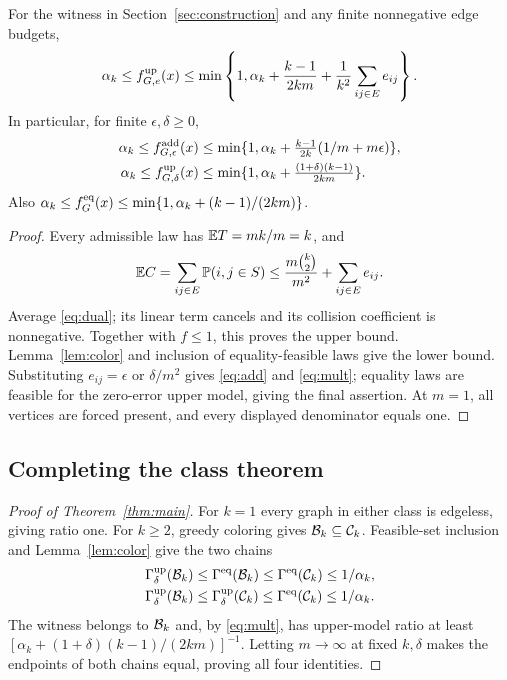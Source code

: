 \begin{theorem}\label{thm:finite}
For the witness in Section~\ref{sec:construction} and any finite
nonnegative edge budgets,
\begin{equation}\label{eq:hetero}
 \alpha_k\leq f_{G,e}^{\mathrm{up}}(x)\leq
 \min\left\{1,\alpha_k+\frac{k-1}{2km}+\frac1{k^2}\sum_{ij\in E}e_{ij}\right\}.
\end{equation}
In particular, for finite \(\epsilon,\delta\geq0\),
\begin{align}
 \alpha_k\leq f_{G,\epsilon}^{\mathrm{add}}(x)&\leq
 \min\{1,\alpha_k+\tfrac{k-1}{2k}(1/m+m\epsilon)\},\label{eq:add}\\
 \alpha_k\leq f_{G,\delta}^{\mathrm{up}}(x)&\leq
 \min\{1,\alpha_k+\tfrac{(1+\delta)(k-1)}{2km}\}.\label{eq:mult}
\end{align}
Also \(\alpha_k\leq f_G^{\mathrm{eq}}(x)\leq
\min\{1,\alpha_k+(k-1)/(2km)\}\).
\end{theorem}
\begin{proof}
Every admissible law has \(\mathbb E T=mk/m=k\), and
\[
 \mathbb E C=\sum_{ij\in E}\mathbb P(i,j\in S)
 \leq \frac{m\binom k2}{m^2}+\sum_{ij\in E}e_{ij}.
\]
Average \eqref{eq:dual}; its linear term cancels and its collision coefficient
is nonnegative. Together with \(f\leq1\), this proves the upper bound.
Lemma~\ref{lem:color} and inclusion of equality-feasible laws give the
lower bound. Substituting \(e_{ij}=\epsilon\) or \(\delta/m^2\) gives
\eqref{eq:add} and \eqref{eq:mult}; equality laws are feasible for the
zero-error upper model, giving the final assertion. At \(m=1\), all
vertices are forced present, and every displayed denominator equals one.
\end{proof}

\subsection{Completing the class theorem}\label{sec:classproof}
\begin{proof}[Proof of Theorem~\ref{thm:main}]
For \(k=1\) every graph in either class is edgeless, giving ratio one.
For \(k\geq2\), greedy coloring gives \(\mathcal B_k\subseteq\mathcal C_k\).
Feasible-set inclusion and Lemma~\ref{lem:color} give the two chains
\begin{align*}
 \Gamma_\delta^{\mathrm{up}}(\mathcal B_k)&\leq\Gamma^{\mathrm{eq}}(\mathcal B_k)
 \leq\Gamma^{\mathrm{eq}}(\mathcal C_k)\leq1/\alpha_k,\\
 \Gamma_\delta^{\mathrm{up}}(\mathcal B_k)&\leq\Gamma_\delta^{\mathrm{up}}(\mathcal C_k)
 \leq\Gamma^{\mathrm{eq}}(\mathcal C_k)\leq1/\alpha_k.
\end{align*}
The witness belongs to \(\mathcal B_k\) and, by \eqref{eq:mult}, has upper-model
ratio at least \([\alpha_k+(1+\delta)(k-1)/(2km)]^{-1}\).
Letting \(m\to\infty\) at fixed \(k,\delta\) makes the endpoints of
both chains equal, proving all four identities.
\end{proof}

